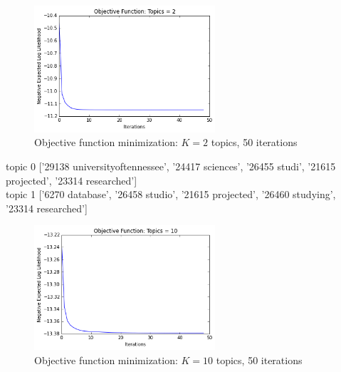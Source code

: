 \documentclass[submit]{harvardml}
\begin{document}
\newpage

\begin{figure}
	\centering
	\includegraphics[width=0.6\textwidth]{output_10_2.png}
	\caption{Objective function minimization: $K = 2$ topics, 50 iterations}
\end{figure}

\noindent
topic 0 ['29138 universityoftennessee', '24417 sciences', '26455 studi', '21615 projected', '23314 researched'] \\
topic 1 ['6270 database', '26458 studio', '21615 projected', '26460 studying', '23314 researched'] \\

\newpage

\begin{figure}
	\centering
	\includegraphics[width=0.6\textwidth]{output_6_2.png}
	\caption{Objective function minimization: $K = 10$ topics, 50 iterations}
\end{figure}
\end{document}
